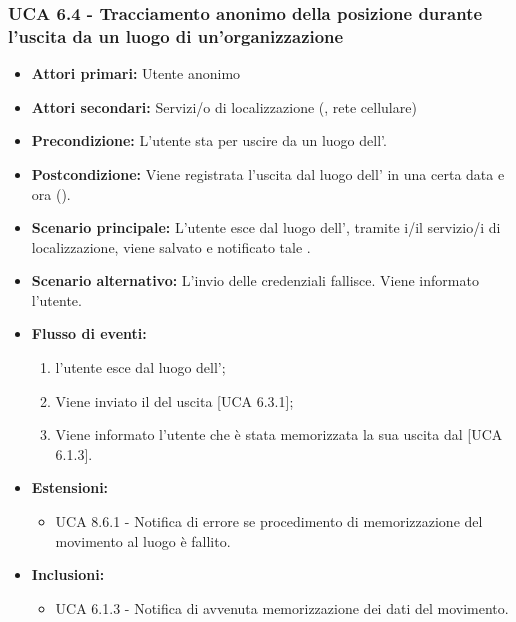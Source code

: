 \subsubsection{UCA 6.4 - Tracciamento anonimo della posizione durante l'uscita da un luogo di un'organizzazione}
\begin{itemize}
	\item \textbf{Attori primari:} Utente anonimo
	\item \textbf{Attori secondari:} Servizi/o di localizzazione (, rete cellulare)
	\item \textbf{Precondizione:} L'utente sta per uscire da un luogo dell'.
	\item \textbf{Postcondizione:} Viene registrata l'uscita dal luogo dell' in una certa data e ora ().
	\item \textbf{Scenario principale:} L'utente esce dal luogo dell', tramite i/il servizio/i di localizzazione, viene salvato e notificato tale . 
	\item \textbf{Scenario alternativo:} L'invio delle credenziali fallisce. Viene informato l'utente.
	\item \textbf{Flusso di eventi:}
	\begin{enumerate}
		\item l'utente esce dal luogo dell';
		\item Viene inviato il  del uscita [UCA 6.3.1];
		\item Viene informato l'utente che è stata memorizzata la sua uscita dal  [UCA 6.1.3].
	\end{enumerate}
	\item \textbf{Estensioni:}
	\begin{itemize}
		\item UCA 8.6.1 - Notifica di errore se procedimento di memorizzazione del movimento al luogo è fallito.
	\end{itemize}
	\item \textbf{Inclusioni:}
	\begin{itemize}
		\item UCA 6.1.3 - Notifica di avvenuta memorizzazione dei dati del movimento.
	\end{itemize}
\end{itemize}